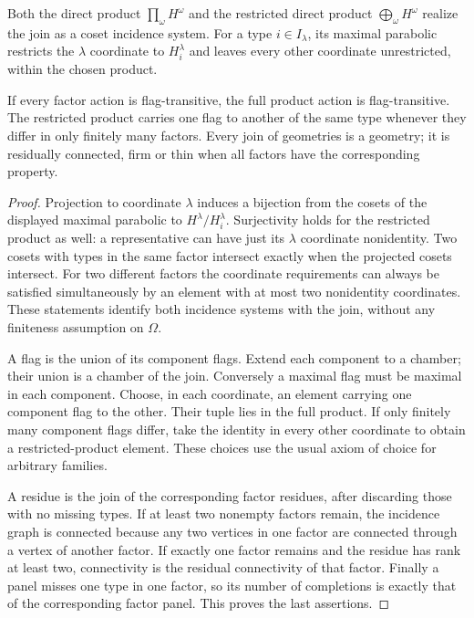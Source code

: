 \begin{proposition}\label{prop:joins}
Both the direct product $\prod_\omega H^\omega$ and the restricted
direct product $\bigoplus_\omega H^\omega$ realize the join as a coset
incidence system. For a type $i\in I_\lambda$, its maximal parabolic
restricts the $\lambda$ coordinate to $H_i^\lambda$ and leaves every
other coordinate unrestricted, within the chosen product.

If every factor action is flag-transitive, the full product action is
flag-transitive. The restricted product carries one flag to another of
the same type whenever they differ in only finitely many factors. Every
join of geometries is a geometry; it is residually connected, firm or
thin when all factors have the corresponding property.
\end{proposition}
\begin{proof}
Projection to coordinate $\lambda$ induces a bijection from the cosets
of the displayed maximal parabolic to $H^\lambda/H_i^\lambda$.
Surjectivity holds for the restricted product as well: a representative
can have just its $\lambda$ coordinate nonidentity. Two cosets with
types in the same factor intersect exactly when the projected cosets
intersect. For two different factors the coordinate requirements can
always be satisfied simultaneously by an element with at most two
nonidentity coordinates. These statements identify both incidence
systems with the join, without any finiteness assumption on $\Omega$.

A flag is the union of its component flags. Extend each component to
a chamber; their union is a chamber of the join. Conversely a maximal
flag must be maximal in each component. Choose, in each coordinate,
an element carrying one component flag to the other. Their tuple lies
in the full product. If only finitely many component flags differ, take
the identity in every other coordinate to obtain a restricted-product
element. These choices use the usual axiom of choice for arbitrary
families.

A residue is the join of the corresponding factor residues, after
discarding those with no missing types. If at least two nonempty factors
remain, the incidence graph is connected because any two vertices in
one factor are connected through a vertex of another factor. If exactly
one factor remains and the residue has rank at least two, connectivity
is the residual connectivity of that factor. Finally a panel misses
one type in one factor, so its number of completions is exactly that of
the corresponding factor panel. This proves the last assertions.
\end{proof}

